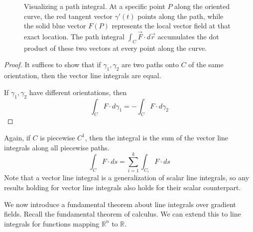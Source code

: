 \begin{definition}
\begin{figure}[H]
			\caption{Visualizing a path integral. At a specific point $P$ along the oriented curve, the red tangent vector $\gamma'(t)$ points along the path, while the solid blue vector $F(P)$ represents the local vector field at that exact location. The path integral $\int_C \vec{F} \cdot d\vec{r}$ accumulates the dot product of these two vectors at every point along the curve.}
			\label{fig:vector_field_tangent}
		\end{figure}
  \end{definition}
	\begin{proof}
	  It suffices to show that if $\gamma_1, \gamma_2$ are two paths onto $C$ of the same orientation, then the vector line integrals are equal. 
		
		If $\gamma_1, \gamma_2$ have different orientations, then 
		\begin{equation}
			\int_C F \cdot d\gamma_1 = - \int_C F \cdot d\gamma_2
		\end{equation}
	\end{proof}
		
	Again, if $C$ is piecewise $C^1$, then the integral is the sum of the vector line integrals along all piecewise paths. 
	\begin{equation}
		\int_C F \cdot d s = \sum_{i = 1}^k \int_{C_i} F \cdot d s
	\end{equation}
	Note that a vector line integral is a generalization of scalar line integrals, so any results holding for vector line integrals also holds for their scalar counterpart. 
		
  We now introduce a fundamental theorem about line integrals over gradient fields. Recall the fundamental theorem of calculus. We can extend this to line integrals for functions mapping $\mathbb{R}^n$ to $\mathbb{R}$. 
		
